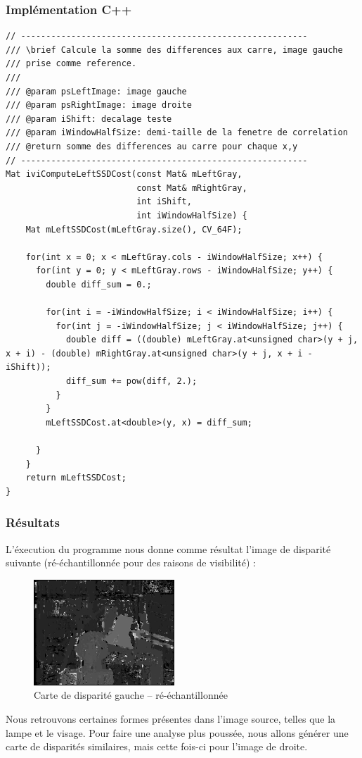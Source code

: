\documentclass[a4paper]{article}
\begin{document}
\subsubsection{Implémentation C++}
\begin{lstlisting}
// ---------------------------------------------------------
/// \brief Calcule la somme des differences aux carre, image gauche
/// prise comme reference.
///
/// @param psLeftImage: image gauche
/// @param psRightImage: image droite
/// @param iShift: decalage teste
/// @param iWindowHalfSize: demi-taille de la fenetre de correlation
/// @return somme des differences au carre pour chaque x,y
// ---------------------------------------------------------
Mat iviComputeLeftSSDCost(const Mat& mLeftGray,
                          const Mat& mRightGray,
                          int iShift,
                          int iWindowHalfSize) {
    Mat mLeftSSDCost(mLeftGray.size(), CV_64F);

    for(int x = 0; x < mLeftGray.cols - iWindowHalfSize; x++) {
      for(int y = 0; y < mLeftGray.rows - iWindowHalfSize; y++) {
        double diff_sum = 0.;

        for(int i = -iWindowHalfSize; i < iWindowHalfSize; i++) {
          for(int j = -iWindowHalfSize; j < iWindowHalfSize; j++) {
            double diff = ((double) mLeftGray.at<unsigned char>(y + j, x + i) - (double) mRightGray.at<unsigned char>(y + j, x + i - iShift));
            diff_sum += pow(diff, 2.);
          }
        }
        mLeftSSDCost.at<double>(y, x) = diff_sum;

      }
    }
    return mLeftSSDCost;
}
\end{lstlisting}

\subsubsection{Résultats}

L'éxecution du programme nous donne comme résultat l'image de disparité suivante (ré-échantillonnée pour des raisons de visibilité) :
\begin{figure}[h]
\begin{center}
	\includegraphics[width=200px]{left-disparity_resampled.png}
\end{center}
\caption{Carte de disparité gauche -- ré-échantillonnée}
\end{figure}
Nous retrouvons certaines formes présentes dans l'image source, telles que la lampe et le visage. Pour faire une analyse plus poussée, nous allons générer une carte de disparités similaires, mais cette fois-ci pour l'image de droite.
\end{document}

